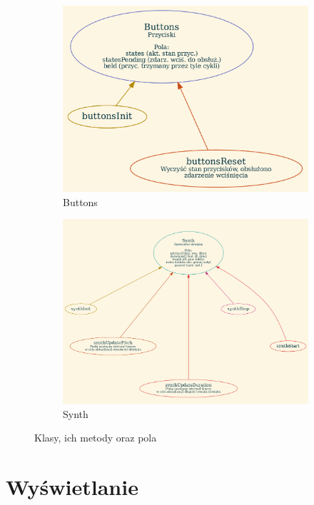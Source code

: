 \documentclass[fleqn]{article}
\begin{document}
\begin{figure}[H]
\begin{subfigure}[b]{0.49\textwidth}
		\includegraphics[width=\textwidth]{assets/g_buttons.png}
		\caption{Buttons}
	\end{subfigure}\hfill
	\begin{subfigure}[b]{0.49\textwidth}
		\includegraphics[width=\textwidth]{assets/g_synth.png}
		\caption{Synth}
	\end{subfigure}
	\caption{Klasy, ich metody oraz pola}
\end{figure}

\section{Wyświetlanie}
\end{document}

